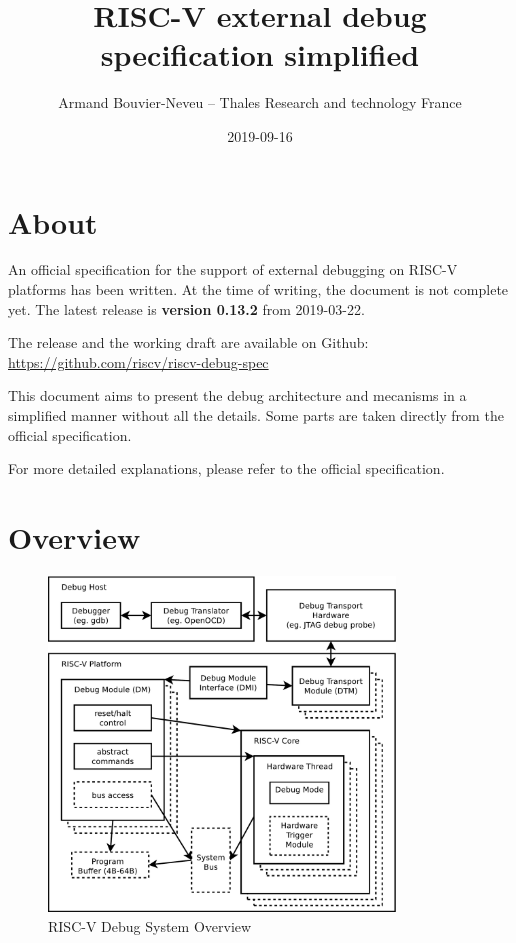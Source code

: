 \documentclass{article}
\title{RISC-V external debug specification simplified}
\date{2019-09-16}
\author{Armand Bouvier-Neveu -- Thales Research and technology France}
\begin{document}
	\maketitle
	
	\section{About}
	
	An official specification for the support of external debugging on RISC-V platforms has been written. At the time of writing, the document is not complete yet. The latest release is \textbf{version 0.13.2} from 2019-03-22.
	
	The release and the working draft are available on Github: \url{https://github.com/riscv/riscv-debug-spec}
	
	This document aims to present the debug architecture and mecanisms in a simplified manner without all the details. Some parts are taken directly from the official specification.
	
	For more detailed explanations, please refer to the official specification.
	
	\newpage
	\section{Overview}
	
	\begin{figure}[H]
   	\centering
   	\includegraphics[width=0.82\textwidth]{overview.pdf}
   	\caption{RISC-V Debug System Overview}
   	\label{fig:overview}
	\end{figure}
	
\end{document}
